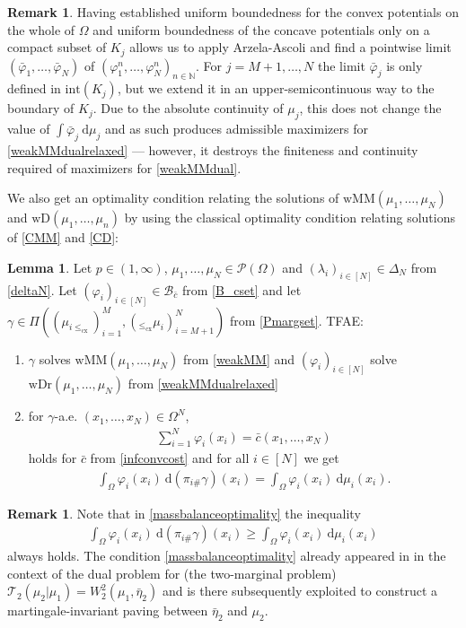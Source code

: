 \documentclass[letterpaper]{amsart}
\newcommand{\NN}{\mathbb{N}}
\newcommand{\dd}{\mathrm{d}}
\theoremstyle{definition}
\newtheorem{lma}[thm]{Lemma}
\newtheorem{rmk}[thm]{Remark}
\begin{document}
\begin{rmk}
	Having established uniform boundedness for the convex potentials on the whole of $\Omega$ and uniform boundedness of the concave potentials only on a compact subset of $K_j$ allows us to apply Arzela-Ascoli and find a pointwise limit $(\bar\varphi_1,\dots,\bar\varphi_N)$ of $(\varphi_1^n,\dots,\varphi_N^n)_{n\in\NN}$. For $j=M+1,\dots,N$ the limit $\bar\varphi_j$ is only defined in $\text{int}(K_j)$, but we extend it in an upper-semicontinuous way to the boundary of $K_j$. Due to the absolute continuity of $\mu_j$, this does not change the value of $\int\bar\varphi_j\ \dd\mu_j$ and as such produces admissible maximizers for \eqref{weakMMdualrelaxed} --- however, it destroys the finiteness and continuity required of maximizers for \eqref{weakMMdual}.
\end{rmk}
We also get an optimality condition relating the solutions of $\text{wMM}(\mu_1,\dots,\mu_N)$ and $\text{wD}(\mu_1,\dots,\mu_n)$ by using the classical optimality condition relating solutions of \eqref{CMM} and \eqref{CD}:
\begin{lma}\label{weakMMoptimality}
	Let $p\in(1,\infty)$, $\mu_1,\dots,\mu_N\in\mathcal P(\Omega)$ and $(\lambda_i)_{i\in [N]}\in\Delta_N$ from \eqref{deltaN}.
	Let $(\varphi_{i})_{i\in[N]}\in\mathcal B_{\bar c}$ from \eqref{B_cset} and let $\gamma\in \Pi((\mu_{i\leq_{\text{cx}}})_{i=1}^M,(_{\leq_{\text{cx}}}\mu_i)_{i=M+1}^N)$ from \eqref{Pmargset}. TFAE:
	\begin{enumerate}
		\item $\gamma$ solves $\text{wMM}(\mu_1,\dots,\mu_N)$ from \eqref{weakMM} and $(\varphi_i)_{i\in[N]}$ solve $\text{wDr}(\mu_1,\dots,\mu_N)$ from \eqref{weakMMdualrelaxed}
		\item for $\gamma$-a.e. $(x_1,\dots,x_N)\in\Omega^N$,
		\begin{gather}\label{MMoptimality}
			\sum_{i=1}^N\varphi_i(x_i)=\bar c(x_1,\dots,x_N)
		\end{gather}
		holds for $\bar c$ from \eqref{infconvcost} and for all $i\in[N]$ we get
		\begin{gather}\label{massbalanceoptimality}
			\int_\Omega\varphi_i(x_i)\ \dd(\pi_{i\#}\gamma)(x_i)=\int_\Omega\varphi_i(x_i)\ \dd\mu_i(x_i).
		\end{gather}
	\end{enumerate}
\end{lma}
\begin{rmk}
	Note that in \eqref{massbalanceoptimality} the inequality
	\begin{gather*}
		\int_\Omega\varphi_i(x_i)\ \dd(\pi_{i\#}\gamma)(x_i)\geq\int_\Omega\varphi_i(x_i)\ \dd\mu_i(x_i)
	\end{gather*}
	always holds.
	The condition \eqref{massbalanceoptimality} already appeared in \cite[Lma 2]{gozlan2025} in the context of the dual problem for (the two-marginal problem) $\mathcal T_2(\mu_2|\mu_1)=W_2^2(\mu_1,\bar\eta_2)$ and is there subsequently exploited \cite[Sec 3]{gozlan2025} to construct a martingale-invariant paving between $\bar\eta_2$ and $\mu_2$.
\end{rmk}
\end{document}
